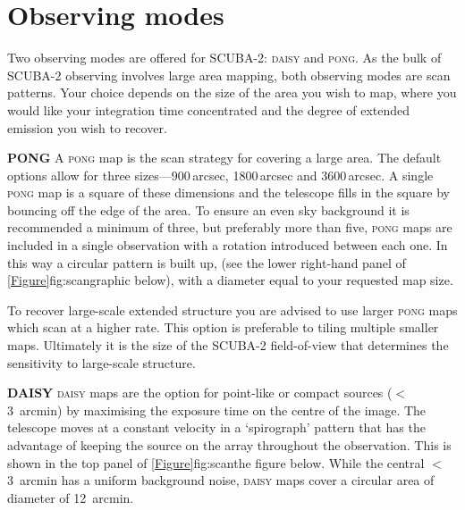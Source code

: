 \section{Observing modes}
\label{sec:mmodes}

Two observing modes are offered for SCUBA-2: \textsc{daisy} and
\textsc{pong}. As the bulk of \mbox{SCUBA-2} observing involves
large area mapping, both observing modes are scan patterns. Your
choice depends on the size of the area you wish to map, where you
would like your integration time concentrated and the degree of
extended emission you wish to recover.


\begin{aligndesc}

\item[\textbf{PONG}] A \textsc{pong} map is the scan strategy for
  covering a large area. The default options allow for three
  sizes---900\,arcsec, 1800\,arcsec and 3600\,arcsec. A single
  \textsc{pong} map is a square of these dimensions and the telescope
  fills in the square by bouncing off the edge of the area. To ensure
  an even sky background it is recommended a minimum of three, but
  preferably more than five, \textsc{pong} maps are included in a
  single observation with a rotation introduced between each one. In
  this way a circular pattern is built up, (see the lower right-hand
  panel of \cref{Figure}{fig:scan}{graphic below}), with a diameter
  equal to your requested map size.

  To recover large-scale extended structure you are advised to use
  larger \textsc{pong} maps which scan at a higher rate. This option
  is preferable to tiling multiple smaller maps. Ultimately it is the
  size of the SCUBA-2 field-of-view that determines the sensitivity to
  large-scale structure.

\item[\textbf{DAISY}] \textsc{daisy} maps are the option for
  point-like or compact sources ($<$3~arcmin) by maximising the
  exposure time on the centre of the image. The telescope moves at a
  constant velocity in a `spirograph' pattern that has the advantage
  of keeping the source on the array throughout the observation. This
  is shown in the top panel of \cref{Figure}{fig:scan}{the figure
    below}. While the central $<$3~arcmin has a uniform background noise,
    \textsc{daisy} maps cover a circular area of diameter of 12~arcmin.

\end{aligndesc}


